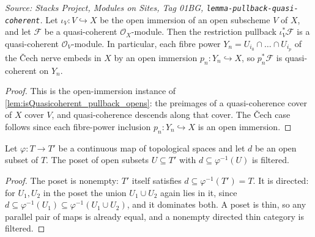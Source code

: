 \begin{lemma}\leanok
  \label{lem:pullback_preserves_quasicoherent}
  \textit{Source: Stacks Project, Modules on Sites, Tag 01BG, \texttt{lemma-pullback-quasi-coherent}.}
  Let \(\iota_V : V \hookrightarrow X\) be the open immersion of an open subscheme \(V\) of \(X\),
  and let \(\mathcal{F}\) be a quasi-coherent \(\mathcal{O}_X\)-module. Then the restriction
  pullback \(\iota_V^*\mathcal{F}\) is a quasi-coherent \(\mathcal{O}_V\)-module. In particular,
  each fibre power \(Y_n = U_{i_0} \cap \dots \cap U_{i_p}\) of the {\v C}ech nerve embeds in
  \(X\) by an open immersion \(p_n : Y_n \hookrightarrow X\), so \(p_n^*\mathcal{F}\) is
  quasi-coherent on \(Y_n\).
\end{lemma}
\begin{proof}
  This is the open-immersion instance of \cref{lem:isQuasicoherent_pullback_opens}: the
  preimages of a quasi-coherence cover of \(X\) cover \(V\), and quasi-coherence descends
  along that cover. The {\v C}ech case follows since each fibre-power inclusion
  \(p_n : Y_n \hookrightarrow X\) is an open immersion.
\end{proof}

\begin{lemma}\leanok
  \label{lem:opensMap_structuredArrow_isFiltered}
  Let \(\varphi : T \to T'\) be a continuous map of topological spaces and let \(d\) be an
  open subset of \(T\). The poset of open subsets \(U \subseteq T'\) with
  \(d \subseteq \varphi^{-1}(U)\) is filtered.
\end{lemma}
\begin{proof}\leanok
  The poset is nonempty: \(T'\) itself satisfies \(d \subseteq \varphi^{-1}(T') = T\). It is
  directed: for \(U_1, U_2\) in the poset the union \(U_1 \cup U_2\) again lies in it, since
  \(d \subseteq \varphi^{-1}(U_1) \subseteq \varphi^{-1}(U_1 \cup U_2)\), and it dominates
  both. A poset is thin, so any parallel pair of maps is already equal, and a nonempty
  directed thin category is filtered.
\end{proof}

